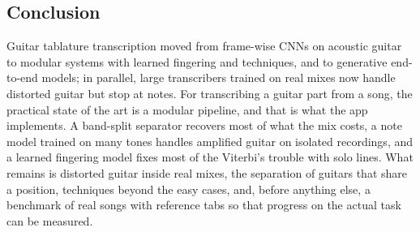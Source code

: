 \subsection{Conclusion}

Guitar tablature transcription moved from frame-wise CNNs on acoustic guitar to
modular systems with learned fingering and techniques, and to generative
end-to-end models; in parallel, large transcribers trained on real mixes now
handle distorted guitar but stop at notes. For transcribing a guitar part from a
song, the practical state of the art is a modular pipeline, and that is what the
app implements. A band-split separator recovers most of what the mix costs, a
note model trained on many tones handles amplified guitar on isolated
recordings, and a learned fingering model fixes most of the Viterbi's trouble
with solo lines. What remains is distorted guitar inside real mixes, the
separation of guitars that share a position, techniques beyond the easy
cases, and, before anything else, a benchmark of real songs with reference tabs
so that progress on the actual task can be measured.
